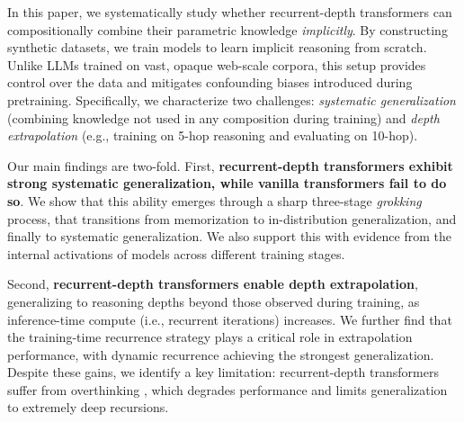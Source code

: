 In this paper, we systematically study whether recurrent-depth transformers can compositionally combine their parametric knowledge \textit{implicitly}. 
By constructing synthetic datasets, we train models to learn implicit reasoning from scratch. Unlike LLMs trained on vast, opaque web-scale corpora, this setup provides control over the data and mitigates confounding biases introduced during pretraining.
Specifically, we characterize two challenges: \textit{systematic generalization} (combining knowledge not used in any composition during training) and \textit{depth extrapolation} (e.g., training on 5-hop reasoning and evaluating on 10-hop).

Our main findings are two-fold. 
First, \textbf{recurrent-depth transformers exhibit strong systematic generalization, while vanilla transformers fail to do so}. 
We show that this ability emerges through a sharp three-stage \textit{grokking} process, 
that transitions from memorization to in-distribution generalization, and finally to systematic generalization.
We also support this with evidence from the internal activations of models across different training stages.

Second, \textbf{recurrent-depth transformers enable depth extrapolation}, generalizing to reasoning depths beyond those observed during training, as inference-time compute (i.e., recurrent iterations) increases. 
We further find that the training-time recurrence strategy plays a critical role in extrapolation performance, with dynamic recurrence achieving the strongest generalization. 
Despite these gains, we identify a key limitation: recurrent-depth transformers suffer from overthinking \citep{bansal2022end}, which degrades performance and limits generalization to extremely deep recursions. 


